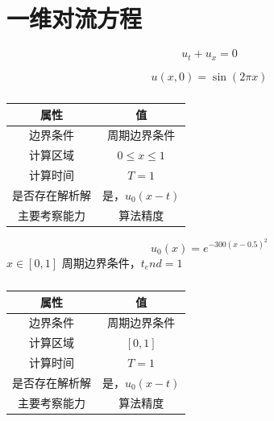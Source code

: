 \documentclass{book}
\begin{document}
\section{一维对流方程}
\begin{equation}
    u_t+u_x=0
\end{equation}
\begin{example}[一维对流方程光滑算例]{}{}
    \begin{equation}
        u(x,0)=\sin (2\pi x)
    \end{equation}

    \begin{table}[htbp]
        \centering
        \label{table:}
        \caption{}
        \begin{tabular}{cc}
            \toprule
            属性           & 值                        \\
            \midrule
            边界条件       & 周期边界条件              \\
            计算区域       & $0\leqslant x\leqslant 1$ \\
            计算时间       & $T=1$                     \\
            是否存在解析解 & 是，$u_0(x-t)$            \\
            主要考察能力   & 算法精度                  \\
            \bottomrule
        \end{tabular}
    \end{table}
\end{example}
\begin{example}{}{}
    \begin{equation}
        u_0(x) = e^{-300(x-0.5)^2}
    \end{equation}
    $x\in[0,1]$ 周期边界条件，$t_end=1$
    \begin{table}[htbp]
        \centering
        \label{table:}
        \caption{}
        \begin{tabular}{cc}
            \toprule
            属性           & 值             \\
            \midrule
            边界条件       & 周期边界条件   \\
            计算区域       & $[0,1]$        \\
            计算时间       & $T=1$          \\
            是否存在解析解 & 是，$u_0(x-t)$ \\
            主要考察能力   & 算法精度       \\
            \bottomrule
        \end{tabular}
    \end{table}
\end{example}
\end{document}
